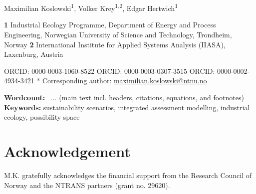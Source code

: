 \begin{titlepage}
    \begin{center}
    
    { \centering \huge \bfseries
    {\multiTitle}}
    \\[0.8cm]
    \HRule \\[1.5cm]
    
    \large
    Maximilian Koslowski\textsuperscript{1\dag*},
    Volker Krey\textsuperscript{1,2\textpilcrow},
    Edgar Hertwich\textsuperscript{1\textcurrency}
    \\
    
    \end{center}
    
    \small
    \bigskip
    \textbf{1} Industrial Ecology Programme, Department of Energy and Process Engineering, Norwegian University of Science and Technology, Trondheim, Norway
    \newline
    \textbf{2} International Institute for Applied Systems Analysis (IIASA), Laxenburg, Austria
    
    \smallskip
    
    
    \dag ORCID: 0000-0003-1060-8522
    \newline
    \textpilcrow ORCID: 0000-0003-0307-3515
    \newline
    \textcurrency ORCID: 0000-0002-4934-3421
    \newline
    * Corresponding author: \href{mailto:maximilian.koslowski@ntnu.no}{maximilian.koslowski@ntnu.no}
    
    \smallskip
    
    \textbf{Wordcount:} ~... (main text incl. headers, citations, equations, and footnotes)
    \newline
    \textbf{Keywords:} sustainability scenarios, integrated assessment modelling, industrial ecology, possibility space
    
    
    
    \section*{Acknowledgement}
    M.K. gratefully acknowledges the financial support from the Research Council of Norway and the NTRANS partners (grant no. 29620).


\end{titlepage}
